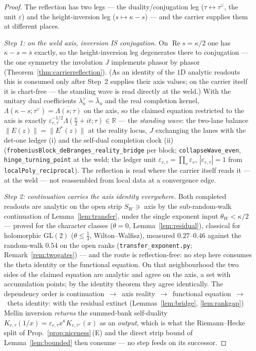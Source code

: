 \documentclass[11pt]{article}
\theoremstyle{definition}
\renewcommand{\Re}{\operatorname{Re}}
\begin{document}
\begin{proof}
The reflection has two legs --- the duality/conjugation leg ($\tau\leftrightarrow\tau^\vee$, the unit
$\varepsilon$) and the height-inversion leg ($s\mapsto\kappa-s$) --- and the carrier supplies them at
different places.

\emph{Step 1: on the weld axis, inversion IS conjugation.} On $\Re s=\kappa/2$ one has $\kappa-s=\bar s$
exactly, so the height-inversion leg degenerates there to conjugation --- the one symmetry the involution $J$
implements phasor by phasor (Theorem~\ref{thm:carrierreflection}). (As an identity of the $1$D analytic
readouts this is consumed only after Step~2 supplies their axis values; on the carrier itself it is chart-free
--- the standing wave is read directly at the weld.) With the unitary dual coefficients
$\lambda_n^{\vee}=\bar\lambda_n$ and the real completion kernel,
$\Lambda(\kappa-s;\tau^\vee)=\overline{\Lambda(s;\tau)}$ on the axis, so the claimed equation restricted to
the axis is exactly $\varepsilon_{r,\tau}^{-1/2}\Lambda(\tfrac\kappa2+it;\tau)\in\mathbb R$ --- the
\emph{standing wave}: the two-lane balance $\|E(z)\|=\|E^{*}(z)\|$ at the reality locus, $J$ exchanging the
lanes with the det-one ledger \textup{(i)} and the self-dual completion clock \textup{(ii)}
(\texttt{frobeniusBlock\_deBranges\_reality\_bridge} per block; \texttt{collapseWave\_even},
\texttt{hinge\_turning\_point} at the weld; the ledger unit $\varepsilon_{r,\tau}=\prod_v\varepsilon_v$,
$|\varepsilon_{r,\tau}|=1$ from \texttt{localPoly\_reciprocal}). The reflection is read where the carrier
itself reads it --- at the weld --- not reassembled from local data at a convergence edge.

\emph{Step 2: continuation carries the axis identity everywhere.} Both completed readouts are analytic on the
open strip $S_W\ni$ axis by the sub-random-walk continuation of Lemma~\ref{lem:transfer}, under the single
exponent input $\theta_W<\kappa/2$ --- proved for the character classes ($\theta=0$,
Lemma~\ref{lem:residual}), classical for holomorphic $\mathrm{GL}(2)$ ($\theta\le\tfrac13$, Wilton--Walfisz),
measured $0.27$--$0.46$ against the random-walk $0.54$ on the open ranks (\texttt{transfer\_exponent.py};
Remark~\ref{rem:twogates}) --- and the route is
reflection-free: no step here consumes the theta identity or the functional equation. On that neighbourhood
the two sides of the claimed equation are analytic and agree on the axis, a set with accumulation points; by
the identity theorem they agree identically. The dependency order is
continuation~$\to$~axis reality~$\to$~functional equation~$\to$~theta identity: with the residual extinct
(Lemmas~\ref{lem:bridge}, \ref{lem:rankgap}) Mellin inversion \emph{returns} the summed-bank self-duality
$K_{r,\tau}(1/x)=\varepsilon_{r,\tau}x^{\kappa}K_{r,\tau^\vee}(x)$ as an \emph{output}, which is what the
Riemann--Hecke split of Prop.~\ref{prop:niceness}\,(E) and the direct strip bound of Lemma~\ref{lem:bounded}
then consume --- no step feeds on its successor.


\end{proof}
\end{document}
